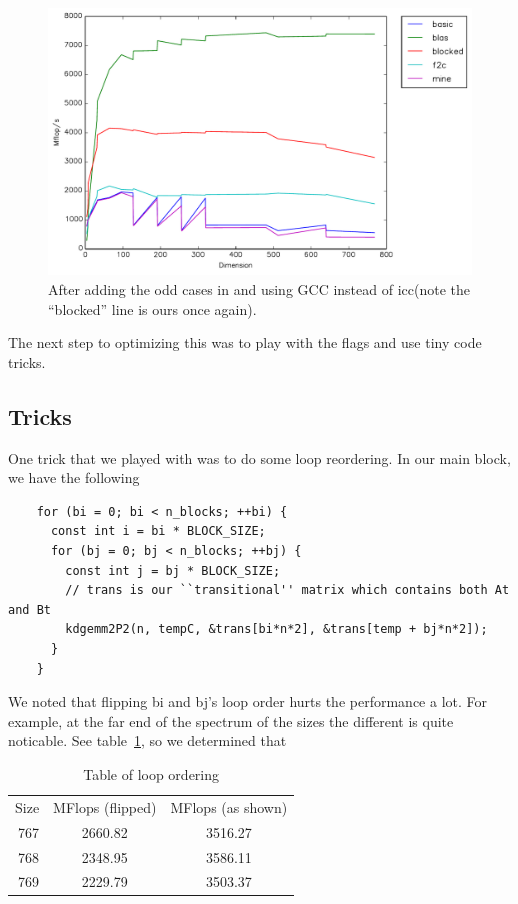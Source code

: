 \documentclass{article}
\begin{document}
  \begin{figure}[h]
    \centering
    \includegraphics[width=.7\textwidth]{odd.pdf}
    \caption{After adding the odd cases in and using GCC instead of icc(note the ``blocked'' line is ours once again).}
    \label{fig:odd}
  \end{figure}

  The next step to optimizing this was to play with the flags and use tiny code tricks.

  \subsection{Tricks}
    One trick that we played with was to do some loop reordering. In our main block, we have the following

    \begin{lstlisting}
    for (bi = 0; bi < n_blocks; ++bi) {
      const int i = bi * BLOCK_SIZE;
      for (bj = 0; bj < n_blocks; ++bj) {
        const int j = bj * BLOCK_SIZE;
        // trans is our ``transitional'' matrix which contains both At and Bt
        kdgemm2P2(n, tempC, &trans[bi*n*2], &trans[temp + bj*n*2]);
      }
    }
    \end{lstlisting}

    We noted that flipping bi and bj's loop order hurts the performance a lot. For example, at the far end of the spectrum of the sizes
    the different is quite noticable. See table~\ref{tab:looporder}, so we determined that 

    \begin{table}
      \centering
      \begin{tabular}{r c c}
        Size & MFlops (flipped) & MFlops (as shown) \\
        767  & 2660.82 & 3516.27\\
        768  & 2348.95 & 3586.11\\
        769  & 2229.79 & 3503.37
      \end{tabular}
      \caption{Table of loop ordering}
      \label{tab:looporder}
    \end{table}
\end{document}
